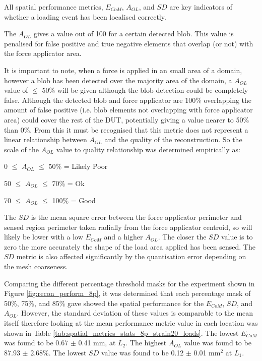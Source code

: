 All spatial performance metrics, $E_{CoM}$, $A_{OL}$, and $S\!D$ are key indicators of whether a loading event has been localised correctly.



The $A_{OL}$ gives a value out of 100 for a certain detected blob. This value is penalised for false positive and true negative elements that overlap (or not) with the force applicator area.

It is important to note, when a force is applied in an small area of a domain, however a blob has been detected over the majority area of the domain, a $A_{OL}$ value of $\leq$ 50\% will be given although the blob detection could be completely false. Although the detected blob and force applicator are 100\% overlapping the amount of false positive (i.e. blob elements not overlapping with force applicator area) could cover the rest of the DUT, potentially giving a value nearer to 50\% than 0\%. From this it must be recognised that this metric does not represent a linear relationship between $A_{OL}$ and the quality of the reconstruction. So the scale of the $A_{OL}$ value to quality relationship was determined empirically as:
\vspace{-0.4cm}
\begin{center}
    \item 0 $\leq$ $A_{OL}$ $\leq$ 50\% = Likely Poor
    \item 50 $\leq$ $A_{OL}$ $\leq$ 70\% = Ok
    \item 70 $\leq$ $A_{OL}$ $\leq$ 100\% = Good
\end{center}

The $S\!D$ is the mean square error between the force applicator perimeter and sensed region perimeter taken radially from the force applicator centroid, so will likely be lower with a low $E_{CoM}$ and a higher $A_{OL}$. The closer the $S\!D$ value is to zero the more accurately the shape of the load area applied has been sensed. The $S\!D$ metric is also affected significantly by the quantisation error depending on the mesh coarseness.

Comparing the different percentage threshold masks for the experiment shown in Figure \ref{fig:recon_perform_8p}, it was determined that each percentage mask of 50\%, 75\%, and 85\% gave showed the spatial performance for the $E_{CoM}$, $S\!D$, and $A_{OL}$. However, the standard deviation of these values is comparable to the mean itself therefore looking at the mean performance metric value in each location was shown in Table \ref{tab:spatial_metrics_stats_8p_strain20_loads}. The lowest $E_{CoM}$ was found to be 0.67 $\pm$ 0.41 mm, at $L_2$. The highest $A_{OL}$ value was found to be 87.93 $\pm$ 2.68\%. The lowest $S\!D$ value was found to be 0.12 $\pm$ 0.01 mm$^2$ at $L_1$.


